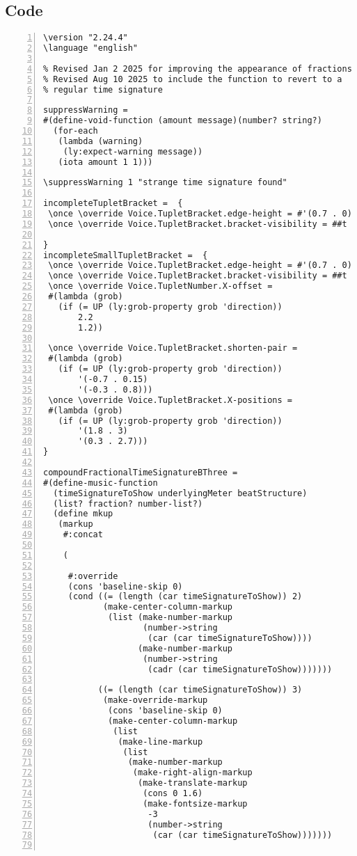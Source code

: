 \subsection{Code}
\begin{Verbatim}[numbers=left,xleftmargin=5mm]
\version "2.24.4"
\language "english"

% Revised Jan 2 2025 for improving the appearance of fractions
% Revised Aug 10 2025 to include the function to revert to a
% regular time signature

suppressWarning =
#(define-void-function (amount message)(number? string?)
  (for-each
   (lambda (warning)
    (ly:expect-warning message))
   (iota amount 1 1)))

\suppressWarning 1 "strange time signature found"

incompleteTupletBracket =  {
 \once \override Voice.TupletBracket.edge-height = #'(0.7 . 0)
 \once \override Voice.TupletBracket.bracket-visibility = ##t

}
incompleteSmallTupletBracket =  {
 \once \override Voice.TupletBracket.edge-height = #'(0.7 . 0)
 \once \override Voice.TupletBracket.bracket-visibility = ##t
 \once \override Voice.TupletNumber.X-offset =
 #(lambda (grob)
   (if (= UP (ly:grob-property grob 'direction))
       2.2
       1.2))

 \once \override Voice.TupletBracket.shorten-pair =
 #(lambda (grob)
   (if (= UP (ly:grob-property grob 'direction))
       '(-0.7 . 0.15)
       '(-0.3 . 0.8)))
 \once \override Voice.TupletBracket.X-positions =
 #(lambda (grob)
   (if (= UP (ly:grob-property grob 'direction))
       '(1.8 . 3)
       '(0.3 . 2.7)))
}

compoundFractionalTimeSignatureBThree =
#(define-music-function
  (timeSignatureToShow underlyingMeter beatStructure)
  (list? fraction? number-list?)
  (define mkup
   (markup
    #:concat

    (

     #:override
     (cons 'baseline-skip 0)
     (cond ((= (length (car timeSignatureToShow)) 2)
            (make-center-column-markup
             (list (make-number-markup
                    (number->string
                     (car (car timeSignatureToShow))))
                   (make-number-markup
                    (number->string
                     (cadr (car timeSignatureToShow)))))))

           ((= (length (car timeSignatureToShow)) 3)
            (make-override-markup
             (cons 'baseline-skip 0)
             (make-center-column-markup
              (list
               (make-line-markup
                (list
                 (make-number-markup
                  (make-right-align-markup
                   (make-translate-markup
                    (cons 0 1.6)
                    (make-fontsize-markup
                     -3
                     (number->string
                      (car (car timeSignatureToShow)))))))


\end{Verbatim}

